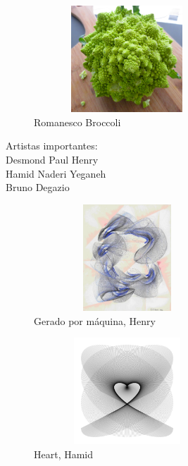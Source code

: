 \documentclass{beamer}
\begin{document}
\begin{frame}
	\begin{figure}[htb]
	\centering
    	    \includegraphics[width=7cm, height=4cm]{images/broc.jpg}
       	        \vspace{0.01em}
                \caption{Romanesco Broccoli}
	\end{figure}
\end{frame}

\begin{frame}
    Artistas importantes: \\
    Desmond Paul Henry \\
    Hamid Naderi Yeganeh \\
    Bruno Degazio

\end{frame}
\begin{frame}
	\begin{figure}[htb]
	\centering
    	    \includegraphics[width=7cm, height=4cm]{images/dr1.jpg}
       	        \vspace{0.01em}
                \caption{Gerado por máquina, Henry}
	\end{figure}
\end{frame}
\begin{frame}
	\begin{figure}[htb]
	\centering
    	    \includegraphics[width=7cm, height=4cm]{images/hamid1.jpg}
       	        \vspace{0.01em}
                \caption{Heart, Hamid}
	\end{figure}
\end{frame}
\end{document}
